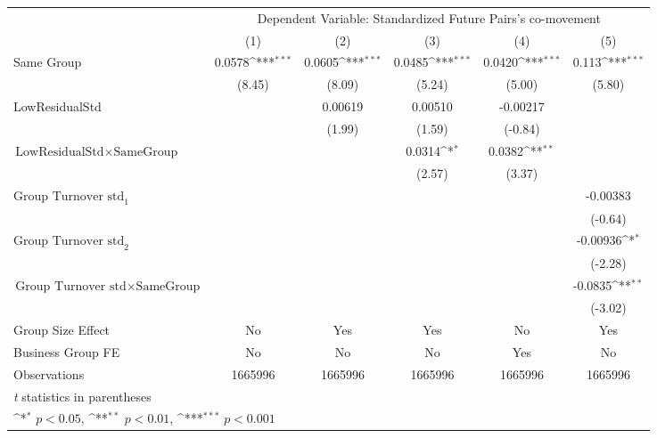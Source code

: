 {
\def\sym#1{\ifmmode^{#1}\else\(^{#1}\)\fi}
\begin{tabular}{l*{5}{c}}
\hline\hline
                &\multicolumn{5}{c}{Dependent Variable: Standardized Future Pairs's co-movement}               \\\cmidrule(lr){2-6}
                &\multicolumn{1}{c}{(1)}         &\multicolumn{1}{c}{(2)}         &\multicolumn{1}{c}{(3)}         &\multicolumn{1}{c}{(4)}         &\multicolumn{1}{c}{(5)}         \\
\hline
Same Group      &   0.0578\sym{***}&   0.0605\sym{***}&   0.0485\sym{***}&   0.0420\sym{***}&    0.113\sym{***}\\
                &   (8.45)         &   (8.09)         &   (5.24)         &   (5.00)         &   (5.80)         \\
[1em]
LowResidualStd  &                  &  0.00619         &  0.00510         & -0.00217         &                  \\
                &                  &   (1.99)         &   (1.59)         &  (-0.84)         &                  \\
[1em]
$ {\text{LowResidualStd} } \times {\text{SameGroup} }  $ &                  &                  &   0.0314\sym{*}  &   0.0382\sym{**} &                  \\
                &                  &                  &   (2.57)         &   (3.37)         &                  \\
[1em]
 $ {\text{Group Turnover std}_1} $ &                  &                  &                  &                  & -0.00383         \\
                &                  &                  &                  &                  &  (-0.64)         \\
[1em]
 $ {\text{Group Turnover std}_2} $ &                  &                  &                  &                  & -0.00936\sym{*}  \\
                &                  &                  &                  &                  &  (-2.28)         \\
[1em]
$ {\text{Group Turnover std} } \times {\text{SameGroup} }  $ &                  &                  &                  &                  &  -0.0835\sym{**} \\
                &                  &                  &                  &                  &  (-3.02)         \\
\hline
Group Size Effect&       No         &      Yes         &      Yes         &       No         &      Yes         \\
Business Group FE&       No         &       No         &       No         &      Yes         &       No         \\
Observations    &  1665996         &  1665996         &  1665996         &  1665996         &  1665996         \\
\hline\hline
\multicolumn{6}{l}{\footnotesize \textit{t} statistics in parentheses}\\
\multicolumn{6}{l}{\footnotesize \sym{*} \(p<0.05\), \sym{**} \(p<0.01\), \sym{***} \(p<0.001\)}\\
\end{tabular}
}
